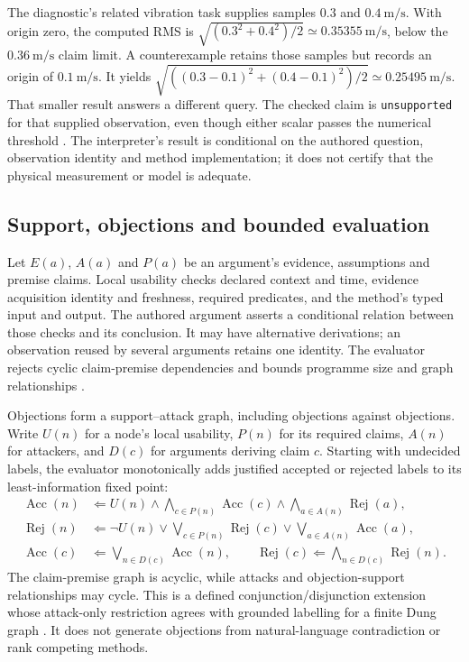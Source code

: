 \documentclass[preprint,12pt]{elsarticle}
\begin{document}
The diagnostic's related vibration task supplies samples \(0.3\) and \(0.4\ \mathrm{m/s}\). With origin zero, the computed RMS is \(\sqrt{(0.3^2+0.4^2)/2}\simeq0.35355\ \mathrm{m/s}\), below the \(0.36\ \mathrm{m/s}\) claim limit. A counterexample retains those samples but records an origin of \(0.1\ \mathrm{m/s}\). It yields \(\sqrt{((0.3-0.1)^2+(0.4-0.1)^2)/2}\simeq0.25495\ \mathrm{m/s}\). That smaller result answers a different query. The checked claim is \texttt{unsupported} for that supplied observation, even though either scalar passes the numerical threshold \citep{earlTask}. The interpreter's result is conditional on the authored question, observation identity and method implementation; it does not certify that the physical measurement or model is adequate.

\subsection{Support, objections and bounded evaluation}
Let \(E(a)\), \(A(a)\) and \(P(a)\) be an argument's evidence, assumptions and premise claims. Local usability checks declared context and time, evidence acquisition identity and freshness, required predicates, and the method's typed input and output. The authored argument asserts a conditional relation between those checks and its conclusion. It may have alternative derivations; an observation reused by several arguments retains one identity. The evaluator rejects cyclic claim-premise dependencies and bounds programme size and graph relationships \citep{earlArgument}.

Objections form a support--attack graph, including objections against objections. Write \(U(n)\) for a node's local usability, \(P(n)\) for its required claims, \(A(n)\) for attackers, and \(D(c)\) for arguments deriving claim \(c\). Starting with undecided labels, the evaluator monotonically adds justified accepted or rejected labels to its least-information fixed point:
\begin{align}
\operatorname{Acc}(n)&\Leftarrow U(n)\land
  \bigwedge_{c\in P(n)}\operatorname{Acc}(c)\land
  \bigwedge_{a\in A(n)}\operatorname{Rej}(a),\\
\operatorname{Rej}(n)&\Leftarrow\neg U(n)\lor
  \bigvee_{c\in P(n)}\operatorname{Rej}(c)\lor
  \bigvee_{a\in A(n)}\operatorname{Acc}(a),\\
\operatorname{Acc}(c)&\Leftarrow\bigvee_{n\in D(c)}\operatorname{Acc}(n),
\qquad
\operatorname{Rej}(c)\Leftarrow\bigwedge_{n\in D(c)}\operatorname{Rej}(n).
\label{eq:labels}
\end{align}
The claim-premise graph is acyclic, while attacks and objection-support relationships may cycle. This is a defined conjunction/disjunction extension whose attack-only restriction agrees with grounded labelling for a finite Dung graph \citep{dung1995,earlArgument}. It does not generate objections from natural-language contradiction or rank competing methods.
\end{document}
